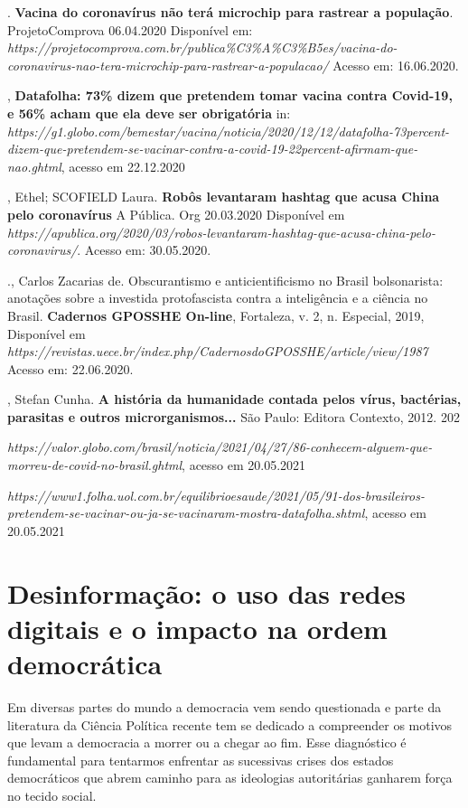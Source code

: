 \begin{bibliohedra}
\titidem. \textbf{Vacina do coronavírus
não terá microchip para rastrear a população}. ProjetoComprova
06.04.2020 Disponível em:
\emph{https://projetocomprova.com.br/publica\%C3\%A\%C3\%B5es/vacina-do-coronavirus-nao-tera-microchip-para-rastrear-a-populacao/}
Acesso em: 16.06.2020.

, \textbf{Datafolha: 73\% dizem que pretendem tomar vacina contra
Covid-19, e 56\% acham que ela deve ser obrigatória} in:
\emph{https://g1.globo.com/bemestar/vacina/noticia/2020/12/12/datafolha-73percent-dizem-que-pretendem-se-vacinar-contra-a-covid-19-22percent-afirmam-que-nao.ghtml},
acesso em 22.12.2020

, Ethel; SCOFIELD Laura. \textbf{Robôs levantaram hashtag que
acusa China pelo coronavírus} A Pública. Org 20.03.2020 Disponível em
\emph{https://apublica.org/2020/03/robos-levantaram-hashtag-que-acusa-china-pelo-coronavirus/}.
Acesso em: 30.05.2020.

., Carlos Zacarias de. Obscurantismo e anticientificismo no
Brasil bolsonarista: anotações sobre a investida protofascista contra a
inteligência e a ciência no Brasil. \textbf{Cadernos GPOSSHE On-line},
Fortaleza, v. 2, n. Especial, 2019, Disponível em
\emph{https://revistas.uece.br/index.php/CadernosdoGPOSSHE/article/view/1987}
Acesso em: 22.06.2020.

, Stefan Cunha. \textbf{A história da humanidade contada pelos
vírus, bactérias, parasitas e outros microrganismos...} São Paulo:
Editora Contexto, 2012. 202

\emph{https://valor.globo.com/brasil/noticia/2021/04/27/86-conhecem-alguem-que-morreu-de-covid-no-brasil.ghtml},
acesso em 20.05.2021

\emph{https://www1.folha.uol.com.br/equilibrioesaude/2021/05/91-dos-brasileiros-pretendem-se-vacinar-ou-ja-se-vacinaram-mostra-datafolha.shtml},
acesso em 20.05.2021
\end{bibliohedra}

\chapter{Desinformação: o uso das redes digitais e o impacto na ordem democrática }

Em diversas partes do mundo a democracia vem sendo questionada e parte
da literatura da Ciência Política recente tem se dedicado a compreender
os motivos que levam a democracia a morrer ou a chegar ao fim. Esse
diagnóstico é fundamental para tentarmos enfrentar as sucessivas crises
dos estados democráticos que abrem caminho para as ideologias
autoritárias ganharem força no tecido social.

